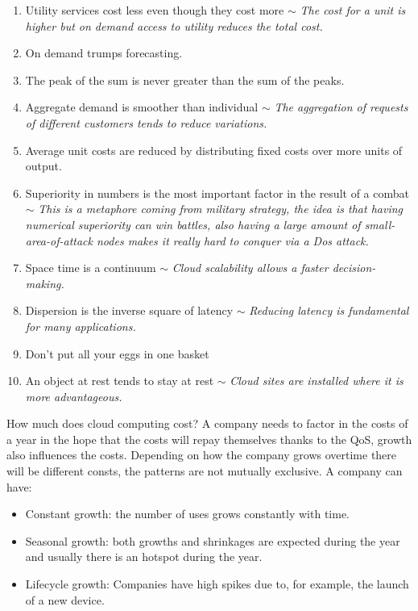 \begin{enumerate}
    \item Utility services cost less even though they cost more $\sim$ \textit{The cost for a unit is higher but on demand access to utility reduces the total cost.}
    \item On demand trumps forecasting.
    \item The peak of the sum is never greater than the sum of the peaks.
    \item Aggregate demand is smoother than individual $\sim$ \textit{The aggregation of requests of different customers tends to reduce variations.}
    \item Average unit costs are reduced by distributing fixed costs over more units of output.
    \item Superiority in numbers is the most important factor in the result of a combat $\sim$ \textit{This is a metaphore coming from military strategy, the idea is that having numerical superiority can win battles, also having a large amount of small-area-of-attack nodes makes it really hard to conquer via a Dos attack.}
    \item Space time is a continuum $\sim$ \textit{Cloud scalability allows a faster decision-making.}
    \item Dispersion is the inverse square of latency $\sim$ \textit{Reducing latency is fundamental for many applications.}
    \item Don't put all your eggs in one basket
    \item An object at rest tends to stay at rest $\sim$ \textit{Cloud sites are installed where it is more advantageous.}
\end{enumerate}
How much does cloud computing cost? A company needs to factor in the costs of a year in the hope that the costs will repay themselves thanks to the QoS, growth also influences the costs. Depending on how the company grows overtime there will be different consts, the patterns are not mutually exclusive. \n
A company can have:
\begin{itemize}
    \item Constant growth: the number of uses grows constantly with time.
    \item Seasonal growth: both growths and shrinkages are expected during the year and usually there is an hotspot during the year.
    \item Lifecycle growth: Companies have high spikes due to, for example, the launch of a new device.
\end{itemize}
